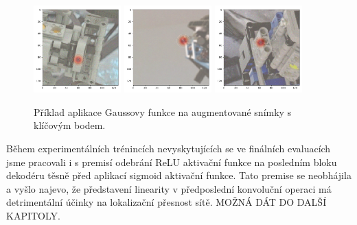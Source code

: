 \begin{figure}[H]
\centering
\includegraphics[width=0.3\textwidth,keepaspectratio]{Figures/kp_examples/kp_example_00.png}
\includegraphics[width=0.3\textwidth,keepaspectratio]{Figures/kp_examples/kp_example_01.png}
\includegraphics[width=0.3\textwidth,keepaspectratio]{Figures/kp_examples/kp_example_02.png}
\caption[Příklad aplikace Gaussovy funkce na snímky s klíčovým bodem]{Příklad aplikace Gaussovy funkce na augmentované snímky s klíčovým bodem.}
\label{fig:kp_examples}
\end{figure}

Během experimentálních trénincích nevyskytujících se ve finálních evaluacích jsme pracovali i s premisí odebrání ReLU aktivační funkce na posledním bloku dekodéru těsně před aplikací sigmoid aktivační funkce. Tato premise se neobhájila a vyšlo najevo, že představení linearity v předposlední konvoluční operaci má detrimentální účinky na lokalizační přesnost sítě. MOŽNÁ DÁT DO DALŠÍ KAPITOLY.
\endinput